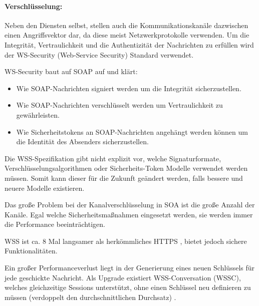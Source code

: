\paragraph{Verschlüsselung:}
Neben den Diensten selbst, stellen auch die Kommunikationskanäle dazwischen einen Angriffsvektor dar, da diese meist Netzwerkprotokolle verwenden. Um die Integrität, Vertraulichkeit und die Authentizität der Nachrichten zu erfüllen wird der WS-Security (Web-Service Security) Standard verwendet.

WS-Security baut auf SOAP auf und klärt:\begin{itemize}
    \item Wie SOAP-Nachrichten signiert werden um die Integrität sicherzustellen.
    \item Wie SOAP-Nachrichten verschlüsselt werden um Vertraulichkeit zu gewährleisten.
    \item Wie Sicherheitstokens an SOAP-Nachrichten angehängt werden können um die Identität des Absenders sicherzustellen.
\end{itemize}

Die WSS-Spezifikation gibt nicht explizit vor, welche Signaturformate, Verschlüsselungsalgorithmen oder Sicherheits-Token Modelle verwendet werden müssen. Somit kann dieser für die Zukunft geändert werden, falls bessere und neuere Modelle existieren.

Das große Problem bei der Kanalverschlüsselung in SOA ist die große Anzahl der Kanäle. Egal welche Sicherheitsmaßnahmen eingesetzt werden, sie werden immer die Performance beeinträchtigen. 

WSS ist ca. 8 Mal langsamer als herkömmliches HTTPS \cite{Lascelles.2006}, bietet jedoch sichere Funktionalitäten. 

Ein großer Performanceverlust liegt in der Generierung eines neuen Schlüssels für jede geschickte Nachricht. Als Upgrade existiert WSS-Conversation (WSSC), welches gleichzeitige Sessions unterstützt, ohne einen Schlüssel neu definieren zu müssen (verdoppelt den durchschnittlichen Durchsatz) \cite{Lascelles.2006}. 